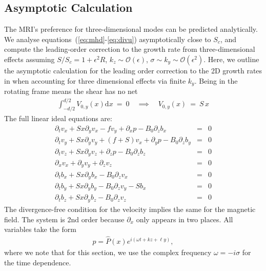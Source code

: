 \documentclass[openacc]{rsproca_new}%
\newcommand{\SSC}{S/S_{c}}
\newcommand\Beq{\begin{eqnarray}}
\newcommand\Eeq{\end{eqnarray}}
\newcommand{\pd}[1]{\partial_{#1}}
\begin{document}
\subsection{Asymptotic Calculation}
\label{sec:asymp}
The MRI's preference for three-dimensional modes can be predicted analytically.
We analyse equations~(\ref{eq:mhd}-\ref{eq:divu}) asymptotically close to $S_{c}$, and compute the leading-order correction to the growth rate from three-dimensional effects assuming $\SSC=1+\epsilon^{2}R$, $k_{z}\sim\mathcal{O}(\epsilon)$, $\sigma\sim{k_{y}}\sim\mathcal{O}(\epsilon^{2})$. 
Here, we outline the asymptotic calculation for the leading order correction to the 2D growth rates in when accounting for three dimensional effects via finite $k_y$.
Being in the rotating frame means the shear has no net
\Beq
\int_{-d/2}^{d/2} V_{0,y}(x) \text{d} x  \ = \ 0 \quad \implies  \quad V_{0,y}(x) \ = \ S\, x
\Eeq
The full linear ideal equations are:
\Beq\label{u-eq}
\pd{t} v_{x} + S x \pd{y} v_{x} - f v_{y} + \pd{x} p - B_{0} \pd{z} b_{x} &=& 0\\
\pd{t} v_{y} + S x \pd{y} v_{y} + (f+S) v_{x} + \pd{y} p - B_{0} \pd{z} b_{y} &=& 0\label{v-eq} \\
\pd{t} v_{z} + S x \pd{y} v_{z} + \pd{z} p - B_{0} \pd{z} b_{z} &=& 0 \\
\pd{x} v_{x} + \pd{y} v_{y} + \pd{z} v_{z}  &=& 0\\
\pd{t} b_{x} + S x \pd{y} b_{x} - B_{0} \pd{z} v_{x} &=& 0\\
\pd{t} b_{y} + S x \pd{y} b_{y} - B_{0} \pd{z} v_{y} - S b_{x}  &=& 0\\
\pd{t} b_{z} + S x \pd{y} b_{z} - B_{0} \pd{z} v_{z} &=& 0 \label{bz-eq}
\Eeq
The divergence-free condition for the velocity implies the same for the magnetic field.
The system is 2nd order because $\pd{x}$ only appears in two places.
All variables take the form
\Beq
p = \hat{P}(x) e^{ i ( \omega t + k z + \ell y ) },
\Eeq
where we note that for this section, we use the complex frequency $\omega = -i \sigma$ for the time dependence.
\end{document}
